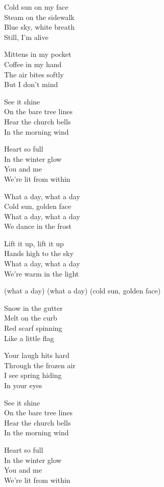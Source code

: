 \begin{lyrics}
Cold sun on my face\\
Steam on the sidewalk\\
Blue sky, white breath\\
Still, I’m alive

Mittens in my pocket\\
Coffee in my hand\\
The air bites softly\\
But I don’t mind

See it shine\\
On the bare tree lines\\
Hear the church bells\\
In the morning wind

Heart so full\\
In the winter glow\\
You and me\\
We’re lit from within

What a day, what a day\\
Cold sun, golden face\\
What a day, what a day\\
We dance in the frost

Lift it up, lift it up\\
Hands high to the sky\\
What a day, what a day\\
We’re warm in the light

(what a day) (what a day)
(cold sun, golden face)

Snow in the gutter\\
Melt on the curb\\
Red scarf spinning\\
Like a little flag

Your laugh hits hard\\
Through the frozen air\\
I see spring hiding\\
In your eyes

See it shine\\
On the bare tree lines\\
Hear the church bells\\
In the morning wind

Heart so full\\
In the winter glow\\
You and me\\
We’re lit from within


\end{lyrics}
